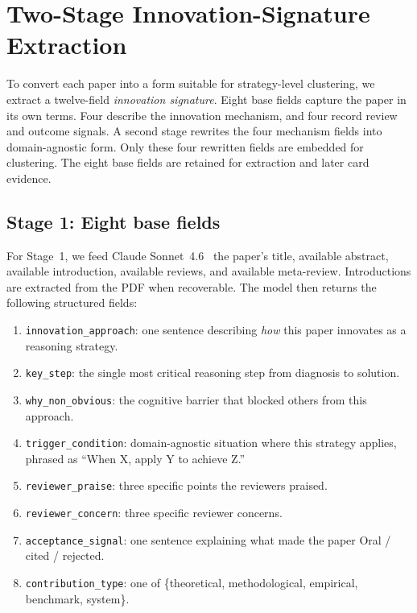 \documentclass[10pt,a4paper]{article}
\begin{document}
\section{Two-Stage Innovation-Signature Extraction}
\label{sec:extract}

To convert each paper into a form suitable for strategy-level clustering, we extract a twelve-field \emph{innovation signature}. Eight base fields capture the paper in its own terms. Four describe the innovation mechanism, and four record review and outcome signals. A second stage rewrites the four mechanism fields into domain-agnostic form. Only these four rewritten fields are embedded for clustering. The eight base fields are retained for extraction and later card evidence.

\subsection{Stage 1: Eight base fields}

For Stage~1, we feed Claude Sonnet~4.6~\cite{anthropic_models_docs} the paper's title, available abstract, available introduction, available reviews, and available meta-review. Introductions are extracted from the PDF when recoverable. The model then returns the following structured fields:

\begin{enumerate}[nosep, leftmargin=1.5em]
\item \texttt{innovation\_approach}: one sentence describing \emph{how} this paper innovates as a reasoning strategy.
\item \texttt{key\_step}: the single most critical reasoning step from diagnosis to solution.
\item \texttt{why\_non\_obvious}: the cognitive barrier that blocked others from this approach.
\item \texttt{trigger\_condition}: domain-agnostic situation where this strategy applies, phrased as ``When X, apply Y to achieve Z.''
\item \texttt{reviewer\_praise}: three specific points the reviewers praised.
\item \texttt{reviewer\_concern}: three specific reviewer concerns.
\item \texttt{acceptance\_signal}: one sentence explaining what made the paper Oral / cited / rejected.
\item \texttt{contribution\_type}: one of \{theoretical, methodological, empirical, benchmark, system\}.
\end{enumerate}
\end{document}

